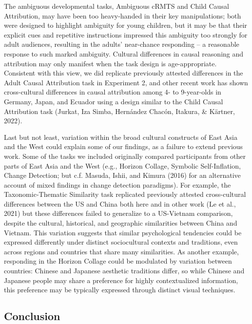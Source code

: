 \documentclass[
  man,floatsintext]{apa6}
\begin{document}
The ambiguous developmental tasks, Ambiguous cRMTS and Child Causal Attribution, may have been too heavy-handed in their key manipulations; both were designed to highlight ambiguity for young children, but it may be that their explicit cues and repetitive instructions impressed this ambiguity too strongly for adult audiences, resulting in the adults' near-chance responding -- a reasonable response to such marked ambiguity. Cultural differences in causal reasoning and attribution may only manifest when the task design is age-appropriate. Consistent with this view, we did replicate previously attested differences in the Adult Causal Attribution task in Experiment 2, and other recent work has shown cross-cultural differences in causal attribution among 4- to 9-year-olds in Germany, Japan, and Ecuador using a design similar to the Child Causal Attribution task (Jurkat, Iza Simba, Hernández Chacón, Itakura, \& Kärtner, 2022).

Last but not least, variation within the broad cultural constructs of East Asia and the West could explain some of our findings, as a failure to extend previous work. Some of the tasks we included originally compared participants from other parts of East Asia and the West (e.g., Horizon Collage, Symbolic Self-Inflation, Change Detection; but c.f. Masuda, Ishii, and Kimura (2016) for an alternative account of mixed findings in change detection paradigms). For example, the Taxonomic-Thematic Similarity task replicated previously attested cross-cultural differences between the US and China both here and in other work (Le et al., 2021) but these differences failed to generalize to a US-Vietnam comparison, despite the cultural, historical, and geographic similarities between China and Vietnam. This variation suggests that similar psychological tendencies could be expressed differently under distinct sociocultural contexts and traditions, even across regions and countries that share many similarities. As another example, responding in the Horizon Collage could be modulated by variation between countries: Chinese and Japanese aesthetic traditions differ, so while Chinese and Japanese people may share a preference for highly contextualized information, this preference may be typically expressed through distinct visual techniques.

\hypertarget{conclusion}{%
\subsection{Conclusion}\label{conclusion}}
\end{document}
